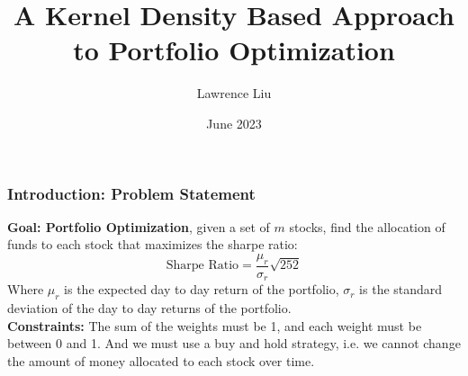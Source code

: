 \documentclass{beamer}
\title{A Kernel Density Based Approach to Portfolio Optimization}
\author{Lawrence Liu}
\date{June 2023}
\begin{document}
\frame{\titlepage}
\begin{frame}
\frametitle{Introduction: Problem Statement}

    \textbf{Goal: Portfolio Optimization}, given a set of $m$ stocks, find the allocation of funds to each stock that maximizes the sharpe ratio:
    \begin{equation}
        \text{Sharpe Ratio} = \frac{\mu_r}{\sigma_r}\sqrt{252}
    \end{equation}
    Where $\mu_r$ is the expected day to day return of the portfolio, $\sigma_r$ is the standard deviation of the day to day returns of the portfolio.\\
    \textbf{Constraints:} The sum of the weights must be 1, and each weight must be between 0 and 1. And we must use a buy and hold strategy, i.e. we cannot change the amount of money allocated to each stock over time.
\end{frame}
\end{document}
